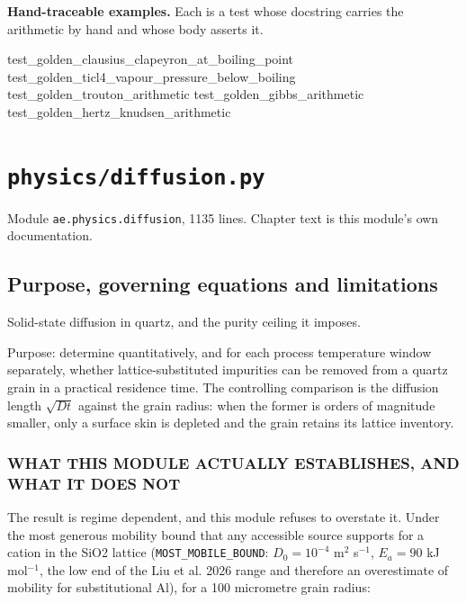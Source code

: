 \documentclass[10pt,a4paper,twoside]{report}
\begin{document}
\normalsize

\textbf{Hand-traceable examples.} Each is a test whose docstring carries the arithmetic by hand and whose body asserts it.

\begin{verbatimsmall}
test_golden_clausius_clapeyron_at_boiling_point
test_golden_ticl4_vapour_pressure_below_boiling
test_golden_trouton_arithmetic
test_golden_gibbs_arithmetic
test_golden_hertz_knudsen_arithmetic
\end{verbatimsmall}

\clearpage

\chapter{\texttt{physics/diffusion.py}}\label{ch:diffusion}


{\footnotesize\color{slate}Module \texttt{ae.physics.diffusion}, 1135 lines. Chapter text is this module's own documentation.\par}

\section{Purpose, governing equations and limitations}

Solid-state diffusion in quartz, and the purity ceiling it imposes.

Purpose: determine quantitatively, and for each process temperature window separately, whether lattice-substituted impurities can be removed from a quartz grain in a practical residence time. The controlling comparison is the diffusion length $\sqrt{Dt}$ against the grain radius: when the former is orders of magnitude smaller, only a surface skin is depleted and the grain retains its lattice inventory.

\subsection*{WHAT THIS MODULE ACTUALLY ESTABLISHES, AND WHAT IT DOES NOT}

The result is regime dependent, and this module refuses to overstate it. Under the most generous mobility bound that any accessible source supports for a cation in the SiO2 lattice (\texttt{MOST\_MOBILE\_BOUND}: $D_0 = 10^{-4}$ m$^{2}$ s$^{-1}$, $E_a = 90$ kJ mol$^{-1}$, the low end of the Liu et al. 2026 range and therefore an overestimate of mobility for substitutional Al), for a 100 micrometre grain radius:
\end{document}
